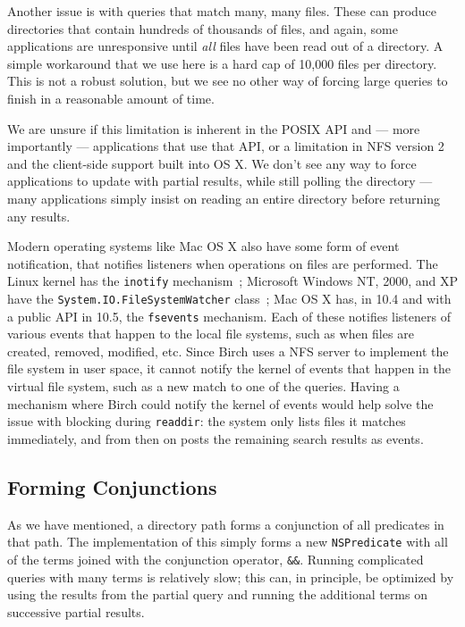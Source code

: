 \documentclass{article}
\begin{document}
Another issue is with queries that match many, many files. These can
produce directories that contain hundreds of thousands of files, and
again, some applications are unresponsive until \emph{all} files have
been read out of a directory. A simple workaround that we use here is
a hard cap of 10,000 files per directory. This is not a robust
solution, but we see no other way of forcing large queries to finish
in a reasonable amount of time.

We are unsure if this limitation is inherent in the POSIX API and ---
more importantly --- applications that use that API, or a limitation
in NFS version 2 and the client-side support built into OS X. We don't
see any way to force applications to update with partial results,
while still polling the directory --- many applications simply insist
on reading an entire directory before returning any results.

Modern operating systems like Mac OS X also have some form of event
notification, that notifies listeners when operations on files are
performed. The Linux kernel has the \texttt{inotify}
mechanism~\cite{Dow:2005}; Microsoft Windows NT, 2000, and XP have the
\texttt{System.IO.FileSystemWatcher}
class~\cite{MSDN:FileSystemWatcher}; Mac OS X has, in 10.4 and with a
public API in 10.5, the \texttt{fsevents} mechanism. Each of these
notifies listeners of various events that happen to the local file
systems, such as when files are created, removed, modified, etc. Since
Birch uses a NFS server to implement the file system in user space, it
cannot notify the kernel of events that happen in the virtual file
system, such as a new match to one of the queries. Having a mechanism
where Birch could notify the kernel of events would help solve the
issue with blocking during \texttt{readdir}: the system only lists
files it matches immediately, and from then on posts the remaining
search results as events.

\subsection{Forming Conjunctions}

As we have mentioned, a directory path forms a conjunction of all
predicates in that path. The implementation of this simply forms a new
\texttt{NSPredicate} with all of the terms joined with the conjunction
operator, \texttt{\&\&}. Running complicated queries with many terms
is relatively slow; this can, in principle, be optimized by using the
results from the partial query and running the additional terms on
successive partial results.
\end{document}
